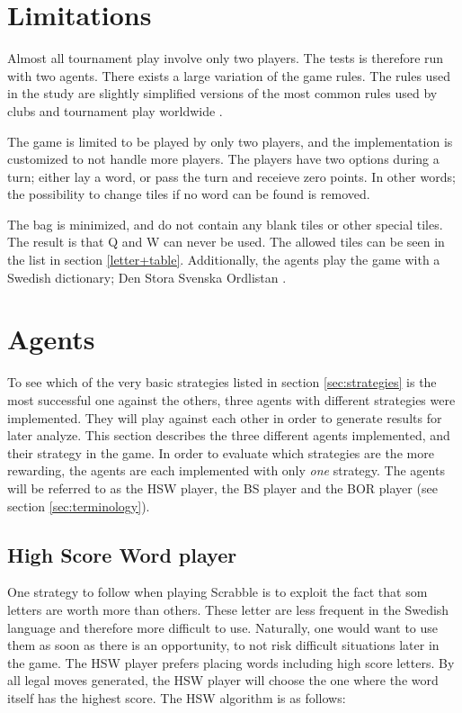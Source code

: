 \documentclass[a4paper, 12pt]{report}
\begin{document}
\section{Limitations}
\label{sec:limitations}
Almost all tournament play involve only two players. The tests is therefore run with two agents. There exists a large variation of the game rules. The rules used in the study are slightly simplified versions of the most common rules used by clubs and tournament play worldwide \cite{forbund} \cite{ABSP} \cite{NASPA}.

The game is limited to be played by only two players, and the implementation is customized to not handle more players. The players have two options during a turn; either lay a word, or pass the turn and receieve zero points. In other words; the possibility to change tiles if no word can be found is removed. 

The bag is minimized, and do not contain any blank tiles or other special tiles. The result is that Q and W can never be used. The allowed tiles can be seen in the list in section \ref{letter+table}. Additionally, the agents play the game with a Swedish dictionary; Den Stora Svenska Ordlistan \cite{dictionary}.

\section{Agents}
\label{sec:agents}
To see which of the very basic strategies listed in section \ref{sec:strategies} is the most successful one against the others, three agents with different strategies were implemented. They will play against each other in order to generate results for later analyze. This section describes the three different agents implemented, and their strategy in the game. In order to evaluate which strategies are the more rewarding, the agents are each implemented with only \emph{one} strategy. The agents will be referred to as the HSW player, the BS player and the BOR player (see section \ref{sec:terminology}).

\subsection{High Score Word player}
One strategy to follow when playing Scrabble is to exploit the fact that som letters are worth more than others. These letter are less frequent in the Swedish language and therefore more difficult to use. Naturally, one would want to use them as soon as there is an opportunity, to not risk difficult situations later in the game. The HSW player prefers placing words including high score letters. By all legal moves generated, the HSW player will choose the one where the word itself has the highest score. The HSW algorithm is as follows:
\end{document}
